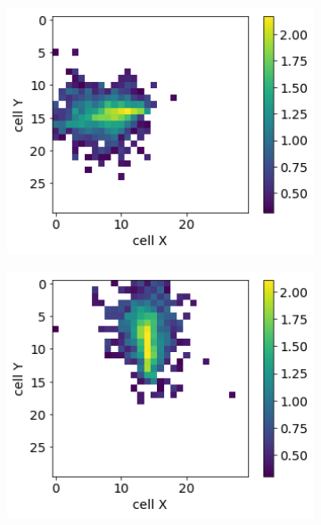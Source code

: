 \documentclass{PoS}
\begin{document}
\begin{figure}
\begin{subfigure}{0.24\textwidth}
    \centering
    \includegraphics[width=1\textwidth]{figures/3_real.png}
  \end{subfigure}
  \begin{subfigure}{0.24\textwidth}
    \centering
    \includegraphics[width=1\textwidth]{figures/4_real.png}
  \end{subfigure}\\
   \begin{subfigure}{0.24\textwidth}
    \centering

\end{subfigure}
\end{figure}
\end{document}
